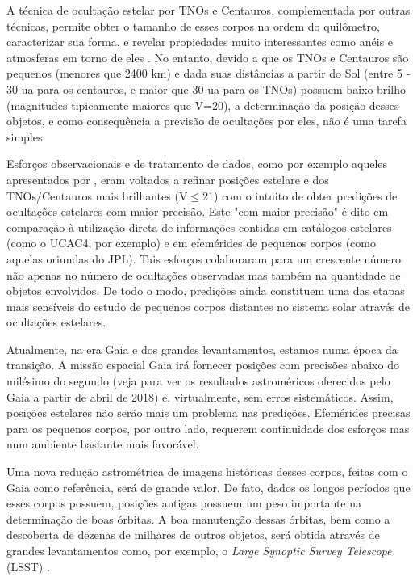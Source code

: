 \documentclass[a4paper, 11pt]{article}
\begin{document}
A técnica de ocultação estelar por TNOs e Centauros, complementada por outras técnicas, permite obter o tamanho de esses corpos na ordem do quilômetro, caracterizar sua forma, e revelar propiedades muito interessantes como anéis \citep{2017Natur.550..219O, 2014AGUFM.P43F..01B} e atmosferas em torno de eles \citep{1538-3881-136-5-1757, 2006Natur.439...52S}. No entanto, devido a que os TNOs e Centauros são pequenos (menores que 2400 km) e dada suas dist\^ancias a partir do Sol (entre  5 - 30 ua para os centauros, e maior que 30 ua para os TNOs) possuem baixo brilho (magnitudes tipicamente maiores que V=20), a determina\c c\~ao da posi\c c\~ao desses objetos, e como consequ\^encia a previsão de ocultações por eles, não é uma tarefa simples. 

 Esforços observacionais e de tratamento de dados, como por exemplo aqueles apresentados por \citep{2010A&A...515A..32A, 2014A&A...561A..37C}, eram voltados a refinar posições estelare e dos TNOs/Centauros mais brilhantes (V$\leq$21) com o intuito de obter predições de ocultações estelares com maior precisão. Este "com maior precisão" é dito em comparação à utilização direta de informações contidas em catálogos estelares (como o UCAC4, por exemplo) e em efemérides de pequenos corpos (como aquelas oriundas do JPL). Tais esfor\c cos colaboraram para um crescente número não apenas no número de ocultações observadas mas também na quantidade de objetos envolvidos. De todo o modo, predições ainda constituem uma das etapas mais sensíveis do estudo de pequenos corpos distantes no sistema solar através de ocultações estelares. 

Atualmente, na era Gaia e dos grandes levantamentos, estamos numa época da transição. A missão espacial Gaia irá fornecer posições com precisões abaixo do milésimo do segundo (veja \citep{2017arXiv171010816K} para ver os resultados astroméricos oferecidos pelo Gaia a partir de abril de 2018) e, virtualmente, sem erros sistemáticos. Assim, posições estelares não serão mais um problema nas predições. Efemérides precisas para os pequenos corpos, por outro lado, requerem continuidade dos esforços mas num ambiente bastante mais favorável.   

Uma nova redução astrométrica de imagens históricas desses corpos, feitas com o Gaia como referência, será de grande valor. De fato, dados os longos períodos que esses corpos possuem, posições antigas possuem um peso importante na determinação de boas órbitas. A boa manutenção dessas órbitas, bem como a descoberta de dezenas de milhares de outros objetos, será obtida através de grandes levantamentos como, por exemplo, o {\it Large Synoptic Survey Telescope} (LSST) \citep{2009arXiv0912.0201L}.
\end{document}
